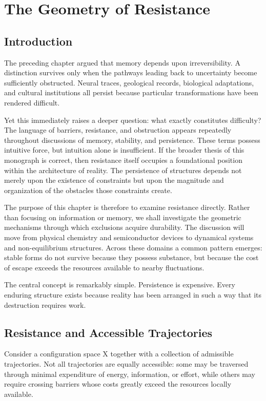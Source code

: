 \documentclass[11pt,oneside]{book}
\theoremstyle{plain}
\theoremstyle{definition}
\theoremstyle{remark}
\begin{document}
\chapter{The Geometry of Resistance}

\section{Introduction}

The preceding chapter argued that memory depends upon irreversibility. A distinction survives only when the pathways leading back to uncertainty become sufficiently obstructed. Neural traces, geological records, biological adaptations, and cultural institutions all persist because particular transformations have been rendered difficult.

Yet this immediately raises a deeper question: what exactly constitutes difficulty? The language of barriers, resistance, and obstruction appears repeatedly throughout discussions of memory, stability, and persistence. These terms possess intuitive force, but intuition alone is insufficient. If the broader thesis of this monograph is correct, then resistance itself occupies a foundational position within the architecture of reality. The persistence of structures depends not merely upon the existence of constraints but upon the magnitude and organization of the obstacles those constraints create.

The purpose of this chapter is therefore to examine resistance directly. Rather than focusing on information or memory, we shall investigate the geometric mechanisms through which exclusions acquire durability. The discussion will move from physical chemistry and semiconductor devices to dynamical systems and non-equilibrium structures. Across these domains a common pattern emerges: stable forms do not survive because they possess substance, but because the cost of escape exceeds the resources available to nearby fluctuations.

The central concept is remarkably simple. Persistence is expensive. Every enduring structure exists because reality has been arranged in such a way that its destruction requires work.

\section{Resistance and Accessible Trajectories}

Consider a configuration space X together with a collection of admissible trajectories. Not all trajectories are equally accessible: some may be traversed through minimal expenditure of energy, information, or effort, while others may require crossing barriers whose costs greatly exceed the resources locally available.
\end{document}
